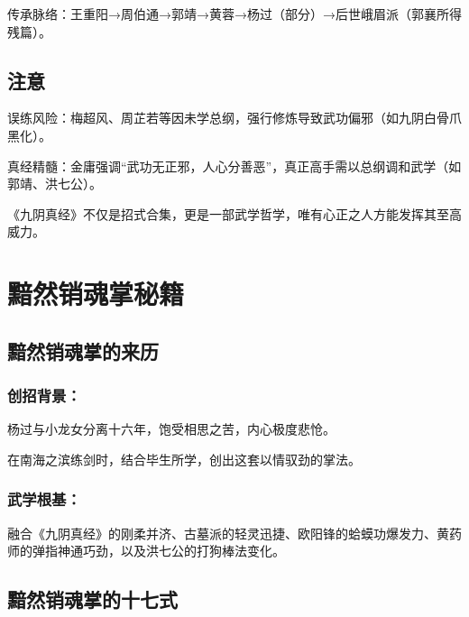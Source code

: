 \documentclass[doctor, vlined, ]{DissertUESTC}
\begin{document}
	传承脉络：王重阳→周伯通→郭靖→黄蓉→杨过（部分）→后世峨眉派（郭襄所得残篇）。

	\section{注意}

	误练风险：梅超风、周芷若等因未学总纲，强行修炼导致武功偏邪（如九阴白骨爪黑化）。

	真经精髓：金庸强调“武功无正邪，人心分善恶”，真正高手需以总纲调和武学（如郭靖、洪七公）。

	《九阴真经》不仅是招式合集，更是一部武学哲学，唯有心正之人方能发挥其至高威力。
	
	\chapter{黯然销魂掌秘籍}
	
	\section{黯然销魂掌的来历}
	
	\subsection{创招背景：}

	杨过与小龙女分离十六年，饱受相思之苦，内心极度悲怆。

	在南海之滨练剑时，结合毕生所学，创出这套以情驭劲的掌法。

	\subsection{武学根基：}

	融合《九阴真经》的刚柔并济、古墓派的轻灵迅捷、欧阳锋的蛤蟆功爆发力、黄药师的弹指神通巧劲，以及洪七公的打狗棒法变化。

	\section{黯然销魂掌的十七式}
\end{document}
